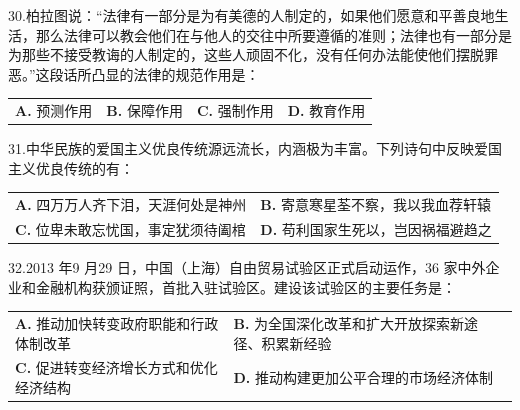 \documentclass[UTF8,11pt]{ctexart}
\begin{document}
30.柏拉图说：“法律有一部分是为有美德的人制定的，如果他们愿意和平善良地生活，那么法律可以教会他们在与他人的交往中所要遵循的准则；法律也有一部分是为那些不接受教诲的人制定的，这些人顽固不化，没有任何办法能使他们摆脱罪恶。”这段话所凸显的法律的规范作用是：


\begin{center}\begin{tabular}{>{\raggedright\arraybackslash}p{\dimexpr(\linewidth-8\tabcolsep)/4\relax}>{\raggedright\arraybackslash}p{\dimexpr(\linewidth-8\tabcolsep)/4\relax}>{\raggedright\arraybackslash}p{\dimexpr(\linewidth-8\tabcolsep)/4\relax}>{\raggedright\arraybackslash}p{\dimexpr(\linewidth-8\tabcolsep)/4\relax}}
\textbf{A.} 预测作用 & \textbf{B.} 保障作用 & \textbf{C.} 强制作用 & \textbf{D.} 教育作用\\[.35em]\end{tabular}\end{center}

31.中华民族的爱国主义优良传统源远流长，内涵极为丰富。下列诗句中反映爱国主义优良传统的有：


\begin{center}\begin{tabular}{>{\raggedright\arraybackslash}p{\dimexpr(\linewidth-4\tabcolsep)/2\relax}>{\raggedright\arraybackslash}p{\dimexpr(\linewidth-4\tabcolsep)/2\relax}}
\textbf{A.} 四万万人齐下泪，天涯何处是神州 & \textbf{B.} 寄意寒星荃不察，我以我血荐轩辕\\[.35em]
\textbf{C.} 位卑未敢忘忧国，事定犹须待阖棺 & \textbf{D.} 苟利国家生死以，岂因祸福避趋之\\[.35em]\end{tabular}\end{center}

32.2013 年9 月29 日，中国（上海）自由贸易试验区正式启动运作，36 家中外企业和金融机构获颁证照，首批入驻试验区。建设该试验区的主要任务是：


\begin{center}\begin{tabular}{>{\raggedright\arraybackslash}p{\dimexpr(\linewidth-4\tabcolsep)/2\relax}>{\raggedright\arraybackslash}p{\dimexpr(\linewidth-4\tabcolsep)/2\relax}}
\textbf{A.} 推动加快转变政府职能和行政体制改革 & \textbf{B.} 为全国深化改革和扩大开放探索新途径、积累新经验\\[.35em]
\textbf{C.} 促进转变经济增长方式和优化经济结构 & \textbf{D.} 推动构建更加公平合理的市场经济体制\\[.35em]\end{tabular}\end{center}
\end{document}
